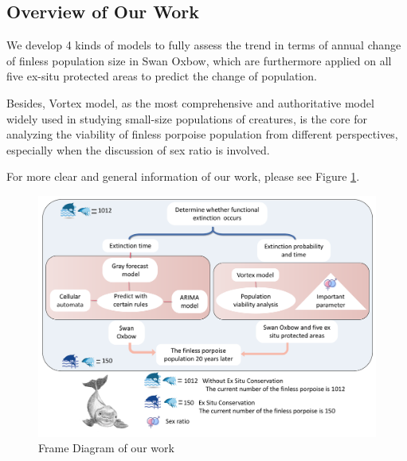 \documentclass{mcmthesis}
\numberwithin{figure}{section}
\numberwithin{table}{section}
\numberwithin{equation}{section}
\begin{document}
\subsection{Overview of Our Work}
We develop 4 kinds of models to fully assess the trend in terms of 
annual change of finless population size in Swan Oxbow, which are 
furthermore applied on all five ex-situ protected areas to predict 
the change of population. 
\par
Besides, Vortex model, as the most comprehensive
and authoritative model widely used in studying small-size populations of
creatures, is the core for analyzing the viability of finless 
porpoise population from different perspectives, especially when 
the discussion of sex ratio is involved.
\par
For more clear and general information of our work, please see 
Figure \ref{Frame}.
\newpage
\begin{figure}[htbp]
  \centering
  \includegraphics[width =13cm]{codes/框架图.pdf}
  \caption{Frame Diagram of our work}\label{Frame}
\end{figure}
\end{document}
